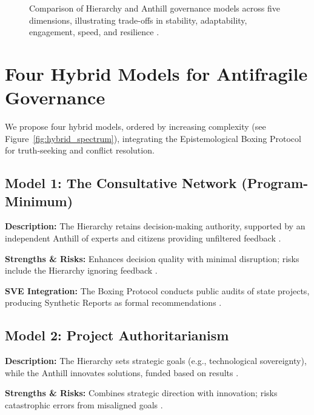 \documentclass[11pt,a4paper]{article}
\begin{document}
\begin{small}
\begin{figure}[h!]
\caption{Comparison of Hierarchy and Anthill governance models across five dimensions, illustrating trade-offs in stability, adaptability, engagement, speed, and resilience \citep{HybridModelsMemo}.}
\label{fig:pure_models_radar}
\end{figure}

\section{Four Hybrid Models for Antifragile Governance}
We propose four hybrid models, ordered by increasing complexity (see Figure~\ref{fig:hybrid_spectrum}), integrating the Epistemological Boxing Protocol for truth-seeking and conflict resolution.

\subsection{Model 1: The Consultative Network (Program-Minimum)}
\textbf{Description:} The Hierarchy retains decision-making authority, supported by an independent Anthill of experts and citizens providing unfiltered feedback \citep[lines 2268--2270]{HybridModelsMemo}.

\textbf{Strengths \& Risks:} Enhances decision quality with minimal disruption; risks include the Hierarchy ignoring feedback \citep[lines 2272--2273]{HybridModelsMemo}.

\textbf{SVE Integration:} The Boxing Protocol conducts public audits of state projects, producing Synthetic Reports as formal recommendations \citep[lines 2276--2277]{HybridModelsMemo}.

\subsection{Model 2: Project Authoritarianism}
\textbf{Description:} The Hierarchy sets strategic goals (e.g., technological sovereignty), while the Anthill innovates solutions, funded based on results \citep[lines 2279--2281]{HybridModelsMemo}.

\textbf{Strengths \& Risks:} Combines strategic direction with innovation; risks catastrophic errors from misaligned goals \citep[lines 2282--2283]{HybridModelsMemo}.


\end{small}
\end{document}
